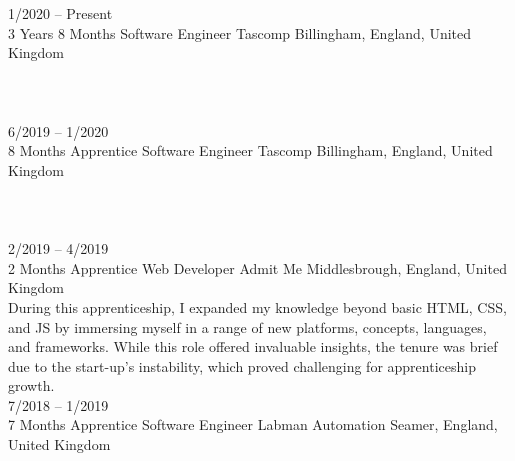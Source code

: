 \documentclass[9pt]{developercv} %
\begin{document}
\begin{entrylist}
	\entry
		{1/2020 -- Present\\3 Years 8 Months}
		{Software Engineer}
		{Tascomp}
		{Billingham, England, United Kingdom\\
		
		\lorem \lorem \lorem \lorem \lorem\\ %
		
		\\
		}\\
	\entry
		{6/2019 -- 1/2020\\8 Months}
		{Apprentice Software Engineer}
		{Tascomp}
		{Billingham, England, United Kingdom\\
		
		\lorem \lorem \lorem \lorem \lorem\\ %
		
		\\
		}\\
	\entry
		{2/2019 -- 4/2019\\2 Months}
		{Apprentice Web Developer}
		{Admit Me}
		{Middlesbrough, England, United Kingdom\\ 
		
		During this apprenticeship, I expanded my knowledge beyond basic HTML, CSS, and JS by immersing myself in a range of new platforms, concepts, languages, and frameworks. While this role offered invaluable insights, the tenure was brief due to the start-up's instability, which proved challenging for apprenticeship growth.
		}\\
	\entry
		{7/2018 -- 1/2019\\7 Months}
		{Apprentice Software Engineer}
		{Labman Automation}
		{Seamer, England, United Kingdom\\ 
		
		\lorem \lorem \lorem \lorem \lorem\\ %
		
		\\
		}\\
\end{entrylist}
\end{document}
